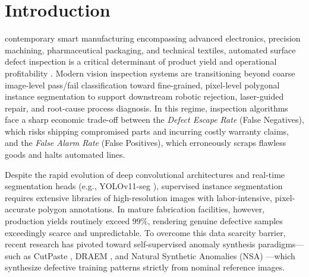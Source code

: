 \section{Introduction}
\label{sec:introduction}
 contemporary smart manufacturing encompassing advanced electronics, precision machining, pharmaceutical packaging, and technical textiles, automated surface defect inspection is a critical determinant of product yield and operational profitability \cite{bergmann2019mvtec, czimmermann2020visual}. Modern vision inspection systems are transitioning beyond coarse image-level pass/fail classification toward fine-grained, pixel-level polygonal instance segmentation to support downstream robotic rejection, laser-guided repair, and root-cause process diagnosis. In this regime, inspection algorithms face a sharp economic trade-off between the \textit{Defect Escape Rate} (False Negatives), which risks shipping compromised parts and incurring costly warranty claims, and the \textit{False Alarm Rate} (False Positives), which erroneously scraps flawless goods and halts automated lines.

Despite the rapid evolution of deep convolutional architectures and real-time segmentation heads (e.g., YOLOv11-seg \cite{ultralytics2024yolo11}), supervised instance segmentation requires extensive libraries of high-resolution images with labor-intensive, pixel-accurate polygon annotations. In mature fabrication facilities, however, production yields routinely exceed $99\%$, rendering genuine defective samples exceedingly scarce and unpredictable. To overcome this data scarcity barrier, recent research has pivoted toward self-supervised anomaly synthesis paradigms---such as CutPaste \cite{li2021cutpaste}, DRAEM \cite{zavrtanik2021draem}, and Natural Synthetic Anomalies (NSA) \cite{schluter2022natural}---which synthesize defective training patterns strictly from nominal reference images.

